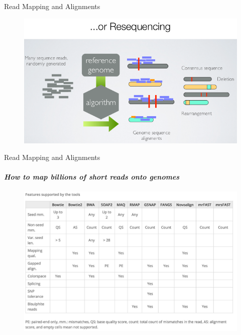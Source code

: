 \documentclass{if-beamer}
\begin{document}
\begin{frame}{Read Mapping and Alignments}
\begin{figure}
\centering
\includegraphics[scale=0.5]{resequencing.PNG}
\end{figure}
\end{frame}
\begin{frame}{Read Mapping and Alignments}
\framesubtitle{\emph{How to map billions of short reads onto genomes}}
\begin{figure}
\centering
\includegraphics[scale=0.475]{aligners_comparison.PNG}
\end{figure}
\end{frame}
\end{document}
